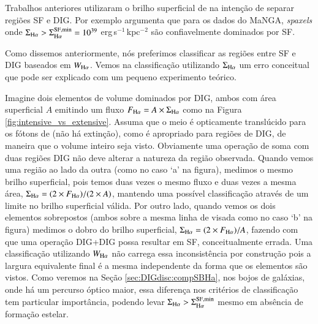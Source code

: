 Trabalhos anteriores utilizaram o brilho superficial de \Ha na intenção de separar regiões SF e DIG. Por exemplo \citet{Zhang.etal.2017a} argumenta que para os dados do MaNGA, {\em spaxels} onde $\Sigma_{\Ha} > \Sigma_{\Ha}^{\rm SF,min} = 10^{39}$ erg$\,$s$^{-1}\,$kpc$^{-2}$ são confiavelmente dominados por SF.

Como dissemos anteriormente, nós preferimos classificar as regiões entre SF e DIG baseados em $W_{\Ha}$. Vemos na classificação utilizando $\Sigma_{\Ha}$ um erro conceitual que pode ser explicado com um pequeno experimento teórico.

Imagine dois elementos de volume dominados por DIG, ambos com área superficial $A$ emitindo um fluxo $F_{\Ha}=A\times\Sigma_{\Ha}$ como na Figura \ref{fig:intensive_vs_extensive}. Assuma que o meio é opticamente translúcido para os fótons de \Ha (não há extinção), como é apropriado para regiões de DIG, de maneira que o volume inteiro seja visto. Obviamente uma operação de soma com duas regiões DIG não deve alterar a natureza da região observada. Quando vemos uma região ao lado da outra (como no caso `a' na figura), medimos o mesmo brilho superficial, pois temos duas vezes o mesmo fluxo e duas vezes a mesma área, $\Sigma_{\Ha}=(2 \times F_{\Ha})/(2 \times A)$, mantendo uma possível classificação através de um limite no brilho superficial válida. Por outro lado, quando vemos os dois elementos sobrepostos (ambos sobre a mesma linha de visada como no caso `b' na figura) medimos o dobro do brilho superficial, $\Sigma_{\Ha}=(2 \times F_{\Ha})/A$, fazendo com que uma operação DIG+DIG possa resultar em SF, conceitualmente errada.
Uma classificação utilizando $W_{\Ha}$ não carrega essa inconsistência por construção pois a largura equivalente final é a mesma independente da forma que os elementos são vistos. Como veremos na Seção \ref{sec:DIGdisc:compSBHa}, nos bojos de galáxias, onde há um percurso óptico maior, essa diferença nos critérios de classificação tem particular importância, podendo levar $\Sigma_{\Ha} > \Sigma_{\Ha}^{\rm SF,min}$ mesmo em absência de formação estelar.

